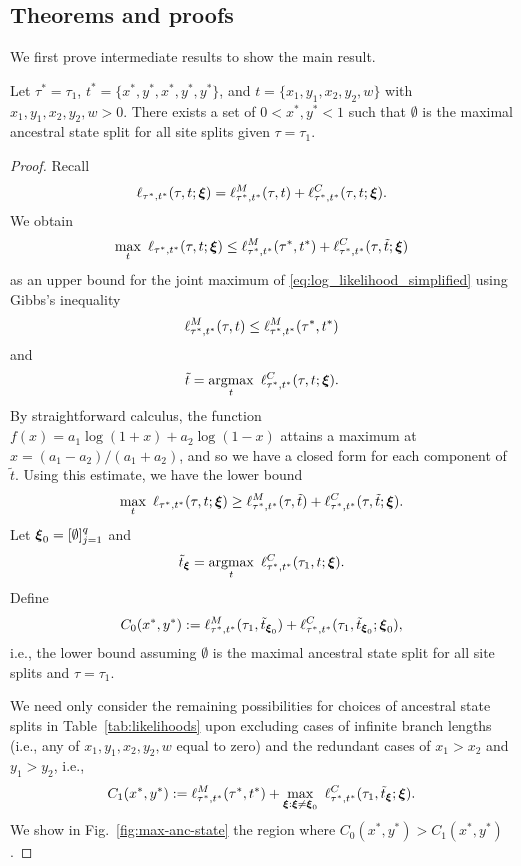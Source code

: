 \subsection*{Theorems and proofs}


We first prove intermediate results to show the main result.

\begin{lemma}
Let $\tau^*=\tau_1$, $t^*=\{x^*, y^*, x^*, y^*, y^*\}$, and $t=\{x_1, y_1, x_2, y_2, w\}$ with $x_1, y_1, x_2, y_2, w > 0$.
There exists a set of $0 < x^*, y^* < 1$ such that $\emptyset$ is the maximal ancestral state split for all site splits given $\tau=\tau_1$.
\label{lemma:ancestral-state}
\end{lemma}

\begin{proof}
Recall
\[
\ell_{\tau^*,t^*}(\tau, t; \boldsymbol\xi) = \ell^M_{\tau^*,t^*}(\tau,t) + \ell^C_{\tau^*,t^*}(\tau, t; \boldsymbol\xi).
\]
We obtain
\[
\max_{t} \ \ell_{\tau^*,t^*}(\tau, t; \boldsymbol\xi) \le
    \ell^M_{\tau^*,t^*}(\tau^*,t^*)
    + \ell^C_{\tau^*,t^*}(\tau, \tilde{t}; \boldsymbol\xi)
\]
as an upper bound for the joint maximum of \eqref{eq:log_likelihood_simplified} using Gibbs's inequality
\[
\ell^M_{\tau^*,t^*}(\tau,t) \le \ell^M_{\tau^*,t^*}(\tau^*,t^*)
\]
and
\[
\tilde{t} = \argmax_{t} \ \ell^C_{\tau^*,t^*}(\tau, t; \boldsymbol\xi).
\]
By straightforward calculus, the function $f(x)=a_1\log(1+x)+a_2\log(1-x)$ attains a maximum at $\hat{x} = (a_1-a_2)/(a_1+a_2)$, and so we have a closed form for each component of $\tilde{t}$.
Using this estimate, we have the lower bound
\[
\max_{t} \ \ell_{\tau^*,t^*}(\tau, t; \boldsymbol\xi) \ge
    \ell^M_{\tau^*,t^*}(\tau,\tilde{t})
    + \ell^C_{\tau^*,t^*}(\tau, \tilde{t}; \boldsymbol\xi).
\]
Let $\boldsymbol\xi_0 = [\emptyset]_{j=1}^q$ and
\[
\tilde{t}_{\boldsymbol\xi} = \argmax_{t} \ \ell^C_{\tau^*,t^*}(\tau_1, t; \boldsymbol\xi).
\]
Define
\[
C_0(x^*, y^*) :=
    \ell^M_{\tau^*,t^*}(\tau_1,\tilde{t}_{\boldsymbol\xi_0})
    + \ell^C_{\tau^*,t^*}(\tau_1, \tilde{t}_{\boldsymbol\xi_0}; \boldsymbol\xi_0),
\]
i.e., the lower bound assuming $\emptyset$ is the maximal ancestral state split for all site splits and $\tau=\tau_1$.

We need only consider the remaining possibilities for choices of ancestral state splits in Table~\ref{tab:likelihoods} upon excluding cases of infinite branch lengths (i.e., any of $x_1,y_1,x_2,y_2,w$ equal to zero) and the redundant cases of $x_1 > x_2$ and $y_1 > y_2$, i.e.,
\[
C_1(x^*, y^*) :=
    \shannonDivergence_{\tau^*,t^*}(\tau^*,t^*)
    +  \max_{\boldsymbol\xi : \boldsymbol\xi \neq \boldsymbol\xi_0} \ \ell^C_{\tau^*,t^*}(\tau_1, \tilde{t}_{\boldsymbol\xi}; \boldsymbol\xi).
\]
We show in Fig.~\ref{fig:max-anc-state} the region where $C_0(x^*,y^*) > C_1(x^*,y^*)$.
\end{proof}

